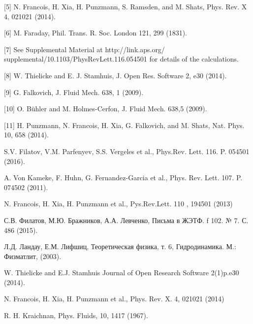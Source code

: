 \begin{thebibliography}{99}
[5] N. Francois, H. Xia, H. Punzmann, S. Ramsden, and M. Shats, Phys. Rev. X 4, 021021 (2014).

[6] M. Faraday, Phil. Trans. R. Soc. London 121, 299 (1831).

[7] See Supplemental Material at http://link.aps.org/
supplemental/10.1103/PhysRevLett.116.054501 for details of the calculations.

[8] W. Thielicke and E. J. Stamhuis, J. Open Res. Software 2, e30 (2014).

[9] G. Falkovich, J. Fluid Mech. 638, 1 (2009).

[10] O. Bühler and M. Holmes-Cerfon, J. Fluid Mech. 638,5 (2009).

[11] H. Punzmann, N. Francois, H. Xia, G. Falkovich, and M. Shats, Nat. Phys. 10, 658 (2014).



S.V. Filatov, V.M. Parfenyev, S.S. Vergeles et al., Phys.Rev. Lett. { 116}. P. 054501 (2016).

A. Von Kameke, F. Huhn, G. Fernandez-Garcia et al., Phys. Rev. Lett. { 107}. P. 074502 (2011).

N. Francois, H. Xia, H. Punzmann et al., Pys.Rev.Lett. { 110 }, 194501 (2013)

С.В. Филатов, М.Ю. Бражников, А.А. Левченко, Письма в ЖЭТФ. {f 102}. № 7. С. 486 (2015).

Л.Д. Ландау, Е.М. Лифшиц, Теоретическая физика, т. 6, Гидродинамика. М.: Физматлит, (2003).

W. Thielicke and E.J. Stamhuis Journal of Open Research Software 2(1)p.e30 (2014).

N. Francois, H. Xia, H. Punzmann et al., Phys. Rev. X. { 4}, 021021 (2014)

R. H. Kraichnan, Phys. Fluids, {10}, 1417 (1967).


\end{thebibliography}
